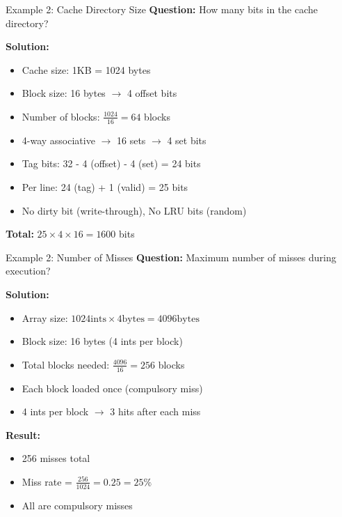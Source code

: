 \documentclass[aspectratio=169,12pt]{beamer}
\begin{document}
\begin{frame}{Example 2: Cache Directory Size}
\textbf{Question:} How many bits in the cache directory?

\textbf{Solution:}
\begin{itemize}
    \item Cache size: 1KB = 1024 bytes
    \item Block size: 16 bytes $\rightarrow$ 4 offset bits
    \item Number of blocks: $\frac{1024}{16} = 64$ blocks
    \item 4-way associative $\rightarrow$ 16 sets $\rightarrow$ 4 set bits
    \item Tag bits: 32 - 4 (offset) - 4 (set) = 24 bits
    \item Per line: 24 (tag) + 1 (valid) = 25 bits
    \item No dirty bit (write-through), No LRU bits (random)
\end{itemize}

\textbf{Total:} $25 \times 4 \times 16 = 1600$ bits
\end{frame}

\begin{frame}{Example 2: Number of Misses}
\textbf{Question:} Maximum number of misses during execution?

\textbf{Solution:}
\begin{itemize}
    \item Array size: $1024 \text{ints} \times 4 \text{bytes} = 4096 \text{bytes}$
    \item Block size: 16 bytes (4 ints per block)
    \item Total blocks needed: $\frac{4096}{16} = 256$ blocks
    \item Each block loaded once (compulsory miss)
    \item 4 ints per block $\rightarrow$ 3 hits after each miss
\end{itemize}

\textbf{Result:} 
\begin{itemize}
    \item 256 misses total
    \item Miss rate = $\frac{256}{1024} = 0.25 = 25\%$
    \item All are compulsory misses
\end{itemize}
\end{frame}
\end{document}

